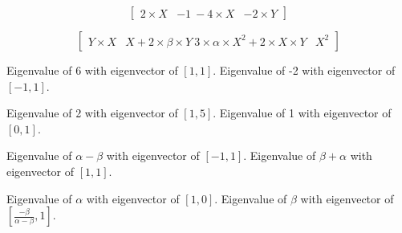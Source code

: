 \documentclass[]{memoir}
\begin{document}
\[
\begin{bmatrix}
2 \times X & -1  \
-4 \times X & -2 \times Y
\end{bmatrix}
\]


\[
\begin{bmatrix} Y \times X & X+2 \times \beta \times Y \ 3 \times \alpha \times X^2 + 2 \times X \times Y & X^2 \end{bmatrix}
\]


Eigenvalue of 6 with eigenvector of $[1,1]$. Eigenvalue of -2 with
eigenvector of $[-1,1]$.


Eigenvalue of 2 with eigenvector of $[1,5]$. Eigenvalue of 1 with
eigenvector of $[0,1]$.


Eigenvalue of $\alpha-\beta$ with eigenvector of $[-1,1]$. Eigenvalue of
$\beta+\alpha$ with eigenvector of $[1,1]$.


Eigenvalue of $\alpha$ with eigenvector of $[1,0]$. Eigenvalue of
$\beta$ with eigenvector of
$\left[\frac{-\beta}{\alpha-\beta},1 \right]$.

\end{document}
